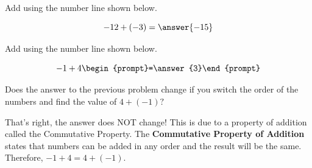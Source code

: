 \documentclass{ximera}[font=12pt]
\begin{document}
\begin{problem}
Add using the number line shown below.

\[ -12 + (-3) = \answer{-15} \]

\begin{center}
\end{center}
\end{problem}


\begin{problem}
Add using the number line shown below.

\[ -1 + 4 \begin{prompt}=\answer{3}\end{prompt} \]

\begin{center}
\end{center}
\end{problem}


\begin{problem}
Does the answer to the previous problem change if you switch the order of the numbers and find the value of $4 + (-1)?$

\begin{multipleChoice}
\end{multipleChoice}

\begin{feedback}[correct]
That's right, the answer does NOT change!  This is due to a property of addition called the Commutative Property.  
The \textbf{Commutative Property of Addition} states that numbers can be added in any order and the result will be the same.  Therefore, $-1 + 4 = 4 + (-1).$
\end{feedback}

\end{problem}
\end{document}
